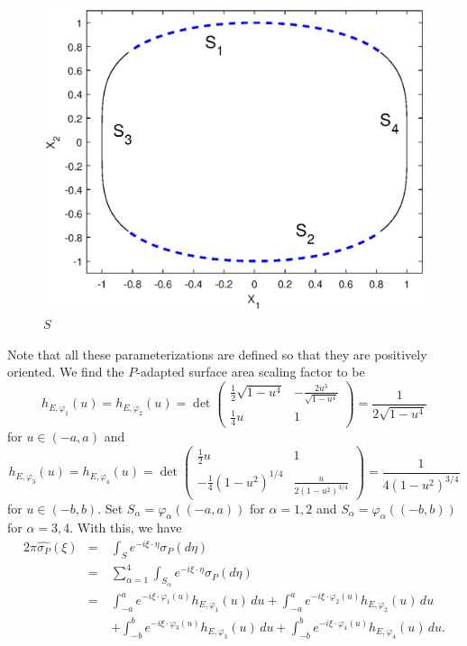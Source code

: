 \documentclass[11pt, letter]{book}
\renewcommand\det{\operatorname{det}}
\newcommand{\f}[2]{\frac{#1}{#2}}
\newcommand{\al}{\alpha}
\begin{document}
\begin{figure}[!htb]
    \centering
    \includegraphics[scale=0.6]{S.eps}
    \caption{$S$}
    \label{fig:S}
\end{figure}

Note that all these parameterizations are defined so that they are positively oriented. We find the $P$-adapted surface area scaling factor to be 
\begin{equation*}
    h_{E,\varphi_1}(u) = h_{E,\varphi_2}(u) = {\det \begin{pmatrix} 
    \f{1}{2}\sqrt{1-u^4} &  -\f{2u^3}{\sqrt{1-u^4}} \\
    \f{1}{4}u & 1
    \end{pmatrix}} = \f{1}{2\sqrt{1-u^4}}
\end{equation*}
for $u\in(-a,a)$ and
\begin{equation*}
    h_{E,\varphi_3}(u) = h_{E,\varphi_4}(u) = {\det\begin{pmatrix}
    \f{1}{2}u&  1  \\
    -\f{1}{4}(1-u^2)^{1/4}  & \f{u}{2(1-u^2)^{3/4}}
    \end{pmatrix}} = \f{1}{4(1 - u^2)^{3/4}}
\end{equation*}
for $u\in(-b,b)$. Set $S_\al=\varphi_\al((-a,a))$ for $\al = 1,2$ and $S_\al=\varphi_\al((-b,b))$ for $\al  = 3,4$. With this, we have
\begin{eqnarray*}
    2\pi \widehat{\sigma_P}(\xi) 
    &=& \int_S e^{-i \xi \cdot \eta }\sigma_P (d\eta) \\
    &=& \sum^{4}_{\al = 1} \int_{S_\al} e^{-i \xi \cdot \eta} \sigma_P(d\eta)\\
    &=& \int_{-a}^a  e^{-i \xi \cdot \varphi_1(u)} h_{E,\varphi_1}(u)\,du  + \int_{-a}^a  e^{-i \xi \cdot \varphi_2(u)} h_{E,\varphi_2}(u)\,du \\
    &\quad& + \int_{-b}^b e^{-i \xi \cdot \varphi_3(u)} h_{E,\varphi_3}(u)\,du + \int_{-b}^b e^{-i \xi \cdot \varphi_4(u)} h_{E,\varphi_4}(u)\,du.
\end{eqnarray*}
\end{document}
